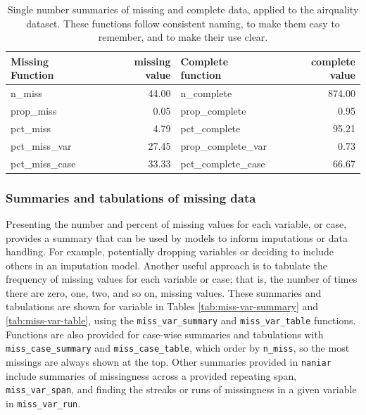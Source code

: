 \documentclass[]{article}
\theoremstyle{definition}
\theoremstyle{definition}
\theoremstyle{definition}
\theoremstyle{remark}
\begin{document}
\begin{table}[!h]

\caption{\label{tab:n-prop-pct-miss-complete}Single number summaries of missing and complete data, applied to the airquality dataset. These functions follow consistent naming, to make them easy to remember, and to make their use clear.}
\centering
\begin{tabular}[t]{lrlr}
\toprule
Missing Function & missing value & Complete function & complete value\\
\midrule
n\_miss & 44.00 & n\_complete & 874.00\\
prop\_miss & 0.05 & prop\_complete & 0.95\\
pct\_miss & 4.79 & pct\_complete & 95.21\\
pct\_miss\_var & 27.45 & prop\_complete\_var & 0.73\\
pct\_miss\_case & 33.33 & pct\_complete\_case & 66.67\\
\bottomrule
\end{tabular}
\end{table}

\hypertarget{sum-tab-missings}{%
\subsubsection{Summaries and tabulations of missing
data}\label{sum-tab-missings}}

Presenting the number and percent of missing values for each variable,
or case, provides a summary that can be used by models to inform
imputations or data handling. For example, potentially dropping
variables or deciding to include others in an imputation model. Another
useful approach is to tabulate the frequency of missing values for each
variable or case; that is, the number of times there are zero, one, two,
and so on, missing values. These summaries and tabulations are shown for
variable in Tables \ref{tab:miss-var-summary} and
\ref{tab:miss-var-table}, using the \texttt{miss\_var\_summary} and
\texttt{miss\_var\_table} functions. Functions are also provided for
case-wise summaries and tabulations with \texttt{miss\_case\_summary}
and \texttt{miss\_case\_table}, which order by \texttt{n\_miss}, so the
most missings are always shown at the top. Other summaries provided in
\texttt{naniar} include summaries of missingness across a provided
repeating span, \texttt{miss\_var\_span}, and finding the streaks or
runs of missingness in a given variable in \texttt{miss\_var\_run}.
\end{document}
